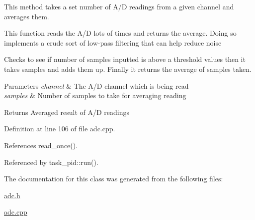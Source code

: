 This method takes a set number of A/\-D readings from a given channel and averages them. 

This function reads the A/\-D lots of times and returns the average. Doing so implements a crude sort of low-\/pass filtering that can help reduce noise

Checks to see if number of samples inputted is above a threshold values then it takes samples and adds them up. Finally it returns the average of samples taken. 
\begin{DoxyParams}{Parameters}
{\em channel} & The A/\-D channel which is being read \\
\hline
{\em samples} & Number of samples to take for averaging reading \\
\hline
\end{DoxyParams}
\begin{DoxyReturn}{Returns}
Averaged result of A/\-D readings 
\end{DoxyReturn}


Definition at line 106 of file adc.\-cpp.



References read\-\_\-once().



Referenced by task\-\_\-pid\-::run().



The documentation for this class was generated from the following files\-:\begin{DoxyCompactItemize}
\item 
\hyperlink{adc_8h}{adc.\-h}\item 
\hyperlink{adc_8cpp}{adc.\-cpp}\end{DoxyCompactItemize}
